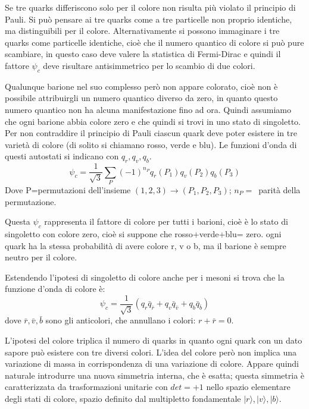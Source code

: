 Se tre quarks differiscono solo per il colore non risulta più violato il 
principio di Pauli.
Si può pensare ai tre quarks come a tre particelle non proprio identiche, ma 
distinguibili per il colore.
Alternativamente si possono immaginare i tre quarks come particelle identiche, 
cioè che il numero quantico di
colore si può pure scambiare, in questo caso deve valere la statistica di 
Fermi-Dirac e quindi il fattore $\psi_c$
deve risultare antisimmetrico per lo scambio di due colori.

Qualunque barione nel suo complesso però non appare colorato, cioè non è 
possibile attribuirgli un numero
quantico diverso da zero, in quanto questo numero quantico non ha alcuna 
manifestazione fino ad ora. Quindi
assumiamo che ogni barione abbia colore zero e che quindi si trovi in uno stato 
di singoletto.
Per non contraddire il principio di Pauli ciascun quark deve poter esistere in 
tre varietà di colore (di solito si
chiamano rosso, verde e blu).
Le funzioni d'onda di questi autostati si indicano con $q_r,q_v,q_b$.
\begin{equation}
\psi_c=\frac{1}{\sqrt{3}}\sum_P(-1)^{n_P}q_r(P_1)q_v(P_2)q_b(P_3)
\end{equation}
Dove P=permutazioni dell'insieme $(1,2,3)\rightarrow(P_1,P_2,P_3)$; $n_P=\,$ 
parità della permutazione.

Questa $\psi_c$ rappresenta il fattore di colore per tutti i barioni, cioè è 
lo stato di singoletto con colore
zero, cioè si suppone che rosso+verde+blu= zero.
ogni quark ha la stessa probabilità di avere colore r, v o b, ma il barione è 
sempre neutro per il colore.

Estendendo l'ipotesi di singoletto di colore anche per i mesoni si trova che la 
funzione d'onda di colore è:
\begin{equation}
\psi_c=\frac{1}{\sqrt{3}}(q_r\bar{q}_{\bar{r}}+q_v\bar{q}_{\bar{v}}+q_b\bar{q}_{
\bar{b}})
\end{equation}
dove $\bar{r},\bar{v},\bar{b}$ sono gli anticolori, che annullano i colori: 
$r+\bar{r}=0$.

L'ipotesi del colore triplica il numero di quarks in quanto ogni quark con un 
dato sapore può esistere con tre diversi colori.
L'idea del colore però non implica una variazione di massa in corrispondenza 
di una variazione di colore.
Appare quindi naturale introdurre una nuova simmetria interna, che è esatta; 
questa simmetria è caratterizzata
da trasformazioni unitarie con $det=+1$ nello spazio elementare degli stati di 
colore, spazio definito dal
multipletto fondamentale $|r\rangle,|v\rangle,|b\rangle$.

